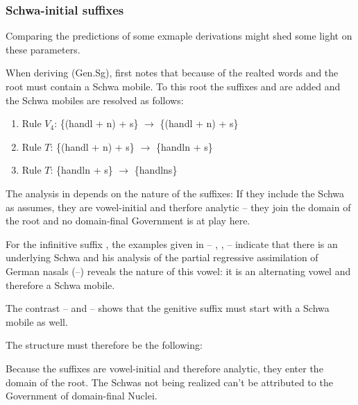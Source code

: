 \subsubsection{Schwa-initial suffixes}
Comparing the predictions of some exmaple derivations might shed
some light on these parameters.

When deriving (Gen.Sg), 
first notes that because of the realted words  and 
the root must contain a Schwa mobile. To this root the suffixes
 and  are added and the
Schwa mobiles are resolved as follows:
\begin{enumerate}
  \newcommand\sN{\schwaMobi{}n}
  \newcommand\sS{\schwaMobi{}s}
  \item Rule $V_4$: \{(hand\schwaMobi{}l + \sN) + \sS\} $\to$
    \{(hand\schwaCons{}l + \sN) + \sS\}
  \item Rule $T$: \{(hand\schwaCons{}l + \sN) + \sS\} $\to$
    \{hand\schwaCons{}ln + \sS\}
  \item Rule $T$: \{hand\schwaCons{}ln + \sS\} $\to$ \{hand\schwaCons{}lns\}
\end{enumerate}

The analysis in \CVCV depends on the nature of the suffixes:
If they include the Schwa as \citeauthor{issatschenko1974}
assumes, they are vowel-initial and therfore analytic
-- they join the domain of the root and no domain-final
Government is at play here.

For the infinitive suffix , the examples given
in \cite[p.~305]{scheer2004} -- , ,
\textellipsis -- indicate that there is an underlying Schwa
and his analysis of the partial regressive assimilation of
German nasals (\ti{[ge:b@n]}--\ti{[ge:b\s{m}]}) reveals the
nature of this vowel: it is an alternating vowel and therefore
a Schwa mobile.

The contrast  --  and
 --  shows that
the genitive suffix must start with a Schwa mobile as well.

The \CVCV structure must therefore be the following:
\begin{structure}
  \emptyV
  \V[floating]{\textschwa}
  \V[floating]{\textschwa}
  \V[floating]{\textschwa}
  \fen
\end{structure}
Because the suffixes are vowel-initial and therefore
analytic, they enter the domain of the root.
The Schwas not being realized can't be attributed to
the Government of domain-final Nuclei.

